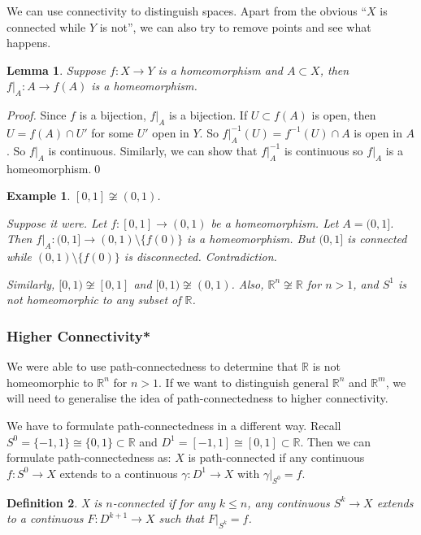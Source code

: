 \documentclass{article}
\theoremstyle{plain}\theoremheaderfont{\normalfont\itshape}\theorembodyfont{\rmfamily}\theoremseparator{.}\newtheorem*{rem}{Remark}\newtheorem*{ex}{Example}\newtheorem*{proof}{Proof}\newtheorem*{altp}{Alternative proof}
\theoremstyle{plain}\theoremheaderfont{\normalfont\bfseries}\theorembodyfont{\rmfamily}\theoremseparator{.}\newtheorem{thm}{Theorem}[section]\newtheorem{lem}[thm]{Lemma}\newtheorem{prop}[thm]{Proposition}\newtheorem*{cor}{Corollary}\newtheorem{defn}[thm]{Definition}\newtheorem{clm}[thm]{Claim}\newtheorem{clminproof}{Claim}
\theoremstyle{break}\theoremheaderfont{\normalfont\itshape}\theorembodyfont{\rmfamily}\theoremseparator{.\medskip}\newtheorem*{proofskip}{Proof}\newtheorem*{exs}{Examples}\newtheorem*{rems}{Remarks}
\theoremstyle{break}\theoremheaderfont{\normalfont\bfseries}\theorembodyfont{\rmfamily}\theoremseparator{.\medskip}\newtheorem{lemskip}[thm]{Lemma}\newtheorem{defnskip}[thm]{Definition}\newtheorem{propskip}[thm]{Proposition}\newtheorem{thmskip}[thm]{Theorem}
\newcommand{\qed}{\hfill\ensuremath{\Box}}
\begin{document}
    We can use connectivity to distinguish spaces. Apart from the obvious ``\(X\) is connected while \(Y\) is not'', we can also try to remove points and see what happens.

    \begin{lem}
        Suppose \(f:X\to Y\) is a homeomorphism and \(A\subset X\), then \(f|_A:A\to f(A)\) is a homeomorphism.
    \end{lem}
    \begin{proof}
        Since \(f\) is a bijection, \(f|_A\) is a bijection. If \(U\subset f(A)\) is open, then \(U=f(A)\cap U'\) for some \(U'\) open in \(Y\). So \(f|_A^{-1}(U)=f^{-1}(U)\cap A\) is open in \(A\). So \(f|_A\) is continuous. Similarly, we can show that \(f|_A^{-1}\) is continuous so \(f|_A\) is a homeomorphism.\qed
    \end{proof}

    \begin{ex}
        \([0,1]\not\cong(0,1)\).

        Suppose it were. Let \(f:[0,1]\to(0,1)\) be a homeomorphism. Let \(A=(0,1]\). Then \(f|_A:(0,1]\to (0,1)\setminus\{f(0)\}\) is a homeomorphism. But \((0,1]\) is connected while \((0,1)\setminus\{f(0)\}\) is disconnected. Contradiction.

        Similarly, \([0,1)\not\cong[0,1]\) and \([0,1)\not\cong(0,1)\). Also, \(\mathbb{R}^n\not\cong\mathbb{R}\) for \(n>1\), and \(S^1\) is not homeomorphic to any subset of \(\mathbb{R}\).
    \end{ex}
    \subsubsection*{Higher Connectivity*}
    We were able to use path-connectedness to determine that \(\mathbb{R}\) is not homeomorphic to \(\mathbb{R}^n\) for \(n>1\). If we want to distinguish general \(\mathbb{R}^n\) and \(\mathbb{R}^m\), we will need to generalise the idea of path-connectedness to higher connectivity.

    We have to formulate path-connectedness in a different way. Recall \(S^0=\{-1,1\}\cong\{0,1\}\subset\mathbb{R}\) and \(D^1=[-1,1]\cong[0,1]\subset\mathbb{R}\). Then we can formulate path-connectedness as: \(X\) is path-connected if any continuous \(f:S^0\to X\) extends to a continuous \(\gamma:D^1\to X\) with \(\gamma|_{S^0}=f\).

    \begin{defn}
        X is \textit{\(n\)-connected} if for any \(k\le n\), any continuous \(S^k\to X\) extends to a continuous \(F:D^{k+1}\to X\) such that \(F|_{S^k}=f\).
    \end{defn}
\end{document}
